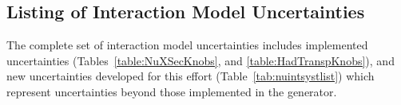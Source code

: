 



\subsection{Listing of Interaction Model Uncertainties}

The complete set of interaction model uncertainties includes  implemented uncertainties 
(Tables~\ref{table:NuXSecKnobs}, and \ref{table:HadTranspKnobs}), 
and new uncertainties developed for this effort (Table~\ref{tab:nuintsystlist}) which represent uncertainties beyond those implemented in the  generator.  

